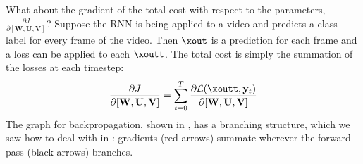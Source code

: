 What about the gradient of the total cost with respect to the parameters, $\frac{\partial J}{\partial [\mathbf{W}, \mathbf{U}, \mathbf{V}]}$? Suppose the RNN is being applied to a video and predicts a class label for every frame of the video. Then $\xout$ is a prediction for each frame and a loss can be applied to each $\xoutt$. The total cost is simply the summation of the losses at each timestep:
\begin{align}
    \frac{\partial J}{\partial [\mathbf{W}, \mathbf{U}, \mathbf{V}]} = \sum_{t=0}^T \frac{\partial \mathcal{L}(\xoutt, \mathbf{y}_t)}{\partial [\mathbf{W}, \mathbf{U}, \mathbf{V}]}
\end{align}
The graph for backpropagation, shown in \fig{\ref{fig:recurrent_neural_networks:bptt_J}}, has a branching structure, which we saw how to deal with in \chap{\ref{chapter:backpropagation}}: gradients (red arrows) summate wherever the forward pass (black arrows) branches. 
